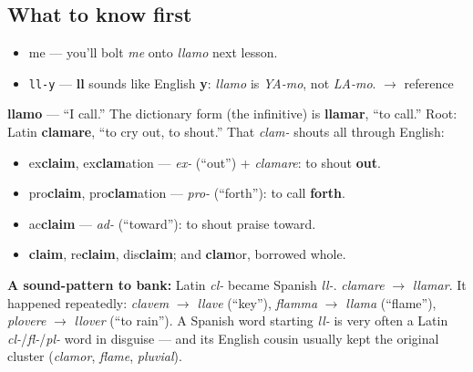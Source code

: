 \subsection*{What to know first}
\begin{itemize}
\raggedright
  \item me — you'll bolt \emph{me} onto \emph{llamo} next lesson.
\end{itemize}

\begin{sounds}
\begin{itemize}
\raggedright
  \item \texttt{ll-y} — \textbf{ll} sounds like English \textbf{y}: \emph{llamo} is \emph{YA-mo}, not \emph{LA-mo}. $\to$ reference
\end{itemize}
\end{sounds}

\begin{cousinweb}
\textbf{llamo} — \textquotedblleft{}I call.\textquotedblright{} The dictionary form (the infinitive) is \textbf{llamar}, \textquotedblleft{}to call.\textquotedblright{} Root: Latin \textbf{clamare}, \textquotedblleft{}to cry out, to shout.\textquotedblright{} That \emph{clam-} shouts all through English:

\begin{itemize}
\raggedright
  \item ex\textbf{claim}, ex\textbf{clam}ation — \emph{ex-} (\textquotedblleft{}out\textquotedblright{}) + \emph{clamare}: to shout \textbf{out}.
  \item pro\textbf{claim}, pro\textbf{clam}ation — \emph{pro-} (\textquotedblleft{}forth\textquotedblright{}): to call \textbf{forth}.
  \item ac\textbf{claim} — \emph{ad-} (\textquotedblleft{}toward\textquotedblright{}): to shout praise toward.
  \item \textbf{claim}, re\textbf{claim}, dis\textbf{claim}; and \textbf{clam}or, borrowed whole.
\end{itemize}

\textbf{A sound-pattern to bank:} Latin \emph{cl-} became Spanish \emph{ll-}. \emph{clamare} $\to$ \emph{llamar}. It happened repeatedly: \emph{clavem} $\to$ \emph{llave} (\textquotedblleft{}key\textquotedblright{}), \emph{flamma} $\to$ \emph{llama} (\textquotedblleft{}flame\textquotedblright{}), \emph{plovere} $\to$ \emph{llover} (\textquotedblleft{}to rain\textquotedblright{}). A Spanish word starting \emph{ll-} is very often a Latin \emph{cl-}/\emph{fl-}/\emph{pl-} word in disguise — and its English cousin usually kept the original cluster (\emph{clamor}, \emph{flame}, \emph{pluvial}).
\end{cousinweb}

